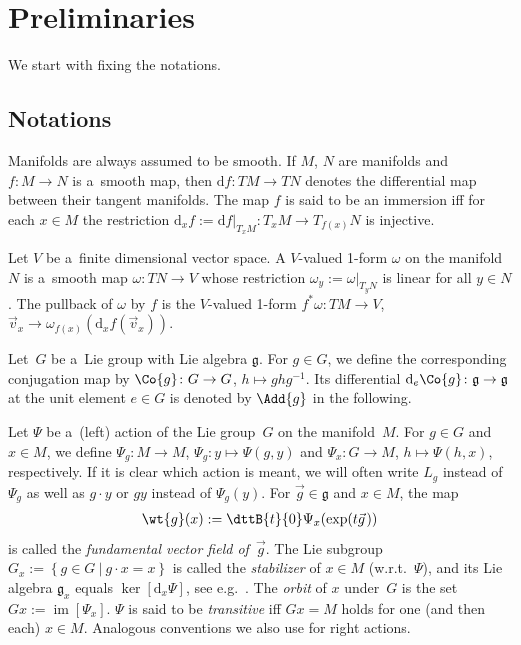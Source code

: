 \section{Preliminaries}\label{sec:prep}

We start with f\/ixing the notations.

\subsection{Notations}\label{sec:notations}

Manifolds are always assumed to be smooth.
If $M$, $N$ are manifolds and $f\colon M\rightarrow N$ is a~smooth map, then $\mathrm{d} f\colon TM\rightarrow TN$ denotes
the dif\/ferential map between their tangent manifolds.
The map $f$ is said to be an immersion if\/f for each $x\in M$ the restriction $\mathrm{d}_xf:=\mathrm{d} f|_{T_xM}\colon
T_xM\rightarrow T_{f(x)}N$ is injective.

Let $V$ be a~f\/inite dimensional vector space.
A $V$-valued 1-form $\omega$ on the manifold $N$ is a~smooth map $\omega\colon TN\rightarrow V$ whose restriction
$\omega_y:=\omega|_{T_yN}$ is linear for all $y\in N$.
The pullback of $\omega$ by $f$ is the $V$-valued 1-form $f^{*}\omega\colon TM\rightarrow V$, $\vec{v}_x\rightarrow
\omega_{f(x)}(\mathrm{d}_xf(\vec{v}_x))$.

Let~$G$ be a~Lie group with Lie algebra $\mathfrak{g}$.
For $g\in G$, we def\/ine the corresponding conjugation map by $\Co{g}\colon G\rightarrow G$, $h\mapsto g h g^{-1}$.
Its dif\/ferential $\mathrm{d}_e\Co{g}\colon \mathfrak{g}\rightarrow \mathfrak{g}$ at the unit element $e\in G$ is denoted
by $\Add{g}$ in the following.

Let $\Psi$ be a~(left) action of the Lie group~$G$ on the manifold~$M$.
For $g\in G$ and $x\in M$, we define $\Psi_g\colon M\rightarrow M$, $\Psi_g\colon y\mapsto \Psi(g,y)$ and $\Psi_x\colon G\rightarrow M$, $h\mapsto\Psi(h,x)$, respectively. If it is clear which action is meant, we will often write $L_g$ instead of $\Psi_g$ as well as $g\cdot y$ or $g y$ instead of $\Psi_g(y)$. For $\vec{g}\in \mathfrak{g}$ and $x\in M$, the map
\begin{gather*}
\wt{g}(x):=\dttB{t}{0} \Psi_x(\exp(t\vec{g}\hspace{1pt}))
\end{gather*}
is called the
\emph{fundamental vector field of~$\vec{g}$}.
The Lie subgroup $G_x:=\left\{g\in G\: \big| \: g\cdot x=x\right\}$ is called the \emph{stabilizer} of $x\in M$
(w.r.t.~$\Psi$), and its Lie algebra $\mathfrak{g}_x$ equals $\ker[\mathrm{d}_x\Psi]$, see e.g.~\cite{DuisKolk}.
The \emph{orbit} of $x$ under~$G$ is the set $Gx:=\operatorname{\mathrm{im}}[\Psi_x]$. $\Psi$ is said to be
\emph{transitive} if\/f $Gx=M$ holds for one (and then each) $x\in M$.
Analogous conventions we also use for right actions.

